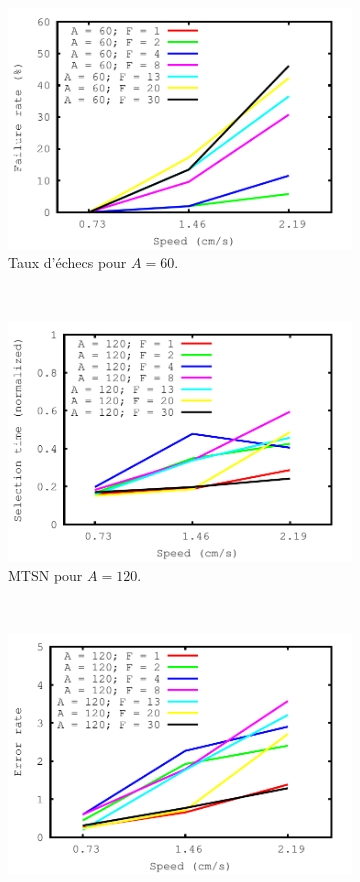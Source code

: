 \begin{figure}[!htb]
\begin{subfigure}[t]{\subImgWlineplot}
			\includegraphics[width=\textwidth]{figures/ch4/speed_angle_60_failures}
			\caption{Taux d'échecs pour $A = 60$.}
			\label{fig:spEffect_f_60}
		\end{subfigure}
		~
		\begin{subfigure}[t]{\subImgWlineplot}
			\centering
			\includegraphics[width=\textwidth]{figures/ch4/speed_angle_120_times}
			\caption{MTSN pour $A = 120$.}
			\label{fig:spEffect_t_120}
		\end{subfigure}
		~
		\begin{subfigure}[t]{\subImgWlineplot}
			\centering
			\includegraphics[width=\textwidth]{figures/ch4/speed_angle_120_errors}

\end{subfigure}
\end{figure}
